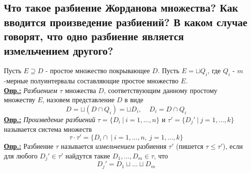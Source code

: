 
\subsection{Что такое разбиение Жорданова множества? Как вводится произведение разбиений? В каком случае говорят, что одно разбиение является измельчением другого?}

Пусть $E \supseteq D$ - простое множество покрывающее $D$. Пусть $E = \sqcup Q_i$, где $Q_i$ - $m$-мерные полуинтервалы составляющие простое множество $E$. \\
\textbf{\underline{Опр.:} } \textit{Разбиением $\tau$} множества $D$, соответствующим данному простому множеству $E$, назовем представление $D$ в виде 
\[D = \sqcup(D\cap Q_i) = \sqcup D_i, \ \ \ \ \ D_i = D\cap Q_i\]
\textbf{\underline{Опр.:} } \textit{Произведение разбиений} $\tau = \{D_i \ | \ i = 1, ..., n\}$ и $\tau' = \{D_j' \ | \ j = 1, ..., k\}$ называется система множеств
\[\tau\cdot\tau' = \{D_i\cap \ | \ i = 1, ..., n, \ j = 1, ..., k\}\]
\textbf{\underline{Опр.:} } Разбиение $\tau$ называется \textit{измельчением} разбиения $\tau'$ (пишется $\tau \leq \tau'$), если для любого $D_j' \in \tau'$ найдутся такие $D_1, ..., D_m \in \tau$, что 
\[D_j' = D_1\sqcup ... \sqcup D_m\]

